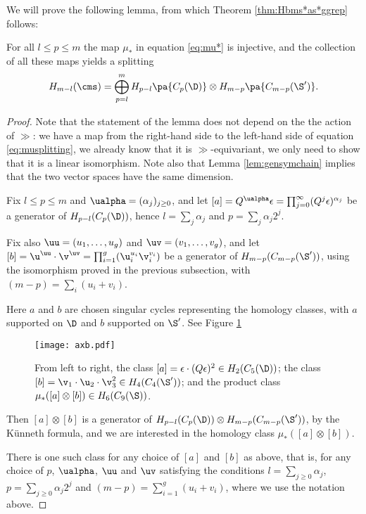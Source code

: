 We will prove the following lemma, from which Theorem \ref{thm:Hbms*as*ggrep} follows:
\begin{lem}
 \label{lem:oplussplitting}
For all $l\leq p\leq m$ the map $\mu_*$ in equation \eqref{eq:mu*} is injective, and the collection
of all these maps yields a splitting
\begin{equation}
  \label{eq:musplitting}
 H_{m-l}(\cms)=\bigoplus_{p=l}^m H_{p-l}\pa{C_p(\D)}\otimes H_{m-p}\pa{C_{m-p}(\S')}.
\end{equation}
\end{lem}
\begin{proof}
Note that the statement of the lemma does not depend on the the action of $\gg$:
we have a map from the right-hand side to the left-hand side of equation \eqref{eq:musplitting},
we already know that it is $\gg$-equivariant,
we only need to show that it is a linear isomorphism. Note also that Lemma \ref{lem:gensymchain}
implies that the two vector spaces have the same dimension.

Fix $l\leq p\leq m$ and $\ualpha=(\alpha_j)_{j\geq 0}$, and let $[a]=Q^{\ualpha}\epsilon=\prod_{j=0}^{\infty}(Q^j\epsilon)^{\alpha_j}$ be a generator of
$H_{p-l}(C_p(\D))$, hence $l=\sum_j\alpha_j$ and $p=\sum_j\alpha_j2^j$.

Fix also $\uu=(u_1,\dots, u_g)$ and $\uv=(v_1,\dots,v_g)$,
and let $[b]=\u^{\uu}\cdot\v^{\uv}=\prod_{i=1}^g (\u_i^{u_i}\v_i^{v_i})$ be a generator of $H_{m-p}(C_{m-p}(\S'))$, using the
isomorphism proved in the previous subsection, with $(m-p)=\sum_i(u_i+v_i)$.

Here $a$ and
$b$ are chosen singular cycles representing the homology classes, with $a$ supported on $\D$
and $b$ supported on $\S'$. See Figure \ref{fig:axb}

\begin{figure}\centering
 \texttt{[image: axb.pdf]}
 \caption{From left to right, the class $[a]=\epsilon\cdot(Q\epsilon)^2\in H_2(C_5(\D))$;
 the class $[b]=\v_1\cdot\u_2\cdot\v_3^2\in H_4(C_4(\S'))$; and the product class
 $\mu_*([a]\otimes[b])\in H_6(C_9(\S))$.}
\label{fig:axb}
\end{figure}

Then $[a]\otimes [b]$ is a generator of $H_{p-l}(C_p(\D))\otimes H_{m-p}(C_{m-p}(\S'))$,
by the K\"unneth formula, and we are interested in the homology class $\mu_*([a]\otimes [b])$.

There is one such
class for any choice of $[a]$ and $[b]$ as above, that is, for any choice of
$p$, $\ualpha$, $\uu$ and $\uv$ satisfying the conditions
$l=\sum_{j\geq 0}\alpha_j$, $p=\sum_{j\geq 0}\alpha_j2^j$ and $(m-p)=\sum_{i=1}^g(u_i+v_i)$, where
we use the notation above.


\end{proof}
